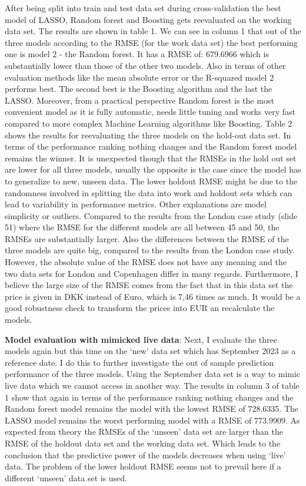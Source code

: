 \documentclass[
]{article}
\begin{document}
After being split into train and test data set during cross-validation
the best model of LASSO, Random forest and Boosting gets reevaluated on
the working data set. The results are shown in table 1. We can see in
column 1 that out of the three models according to the RMSE (for the
work data set) the best performing one is model 2 - the Random forest.
It has a RMSE of: 679.6966 which is substantially lower than those of
the other two models. Also in terms of other evaluation methods like the
mean absolute error or the R-squared model 2 performs best. The second
best is the Boosting algorithm and the last the LASSO. Moreover, from a
practical perspective Random forest is the most convenient model as it
is fully automatic, needs little tuning and works very fast compared to
more complex Machine Learning algorithms like Boosting. Table 2 shows
the results for reevaluating the three models on the hold-out data set.
In terms of the performance ranking nothing changes and the Random
forest model remains the winner. It is unexpected though that the RMSEs
in the hold out set are lower for all three models, usually the opposite
is the case since the model has to generalize to new, unseen data. The
lower holdout RMSE might be due to the randomness involved in splitting
the data into work and holdout sets which can lead to variability in
performance metrics. Other explanations are model simplicity or
outliers. Compared to the results from the London case study (slide 51)
where the RMSE for the different models are all between 45 and 50, the
RMSEs are substantially larger. Also the differences between the RMSE of
the three models are quite big, compared to the results from the London
case study. However, the absolute value of the RMSE does not have any
meaning and the two data sets for London and Copenhagen differ in many
regards. Furthermore, I believe the large size of the RMSE comes from
the fact that in this data set the price is given in DKK instead of
Euro, which is 7,46 times as much. It would be a good robustness check
to transform the prices into EUR an recalculate the models.

\textbf{Model evaluation with mimicked live data}: Next, I evaluate the
three models again but this time on the `new' data set which has
September 2023 as a reference date. I do this to further investigate the
out of sample prediction performance of the three models. Using the
September data set is a way to mimic live data which we cannot access in
another way. The results in column 3 of table 1 show that again in terms
of the performance ranking nothing changes and the Random forest model
remains the model with the lowest RMSE of 728.6335. The LASSO model
remains the worst performing model with a RMSE of 773.9909. As expected
from theory the RMSEs of the `unseen' data set are larger than the RMSE
of the holdout data set and the working data set. Which leads to the
conclusion that the predictive power of the models decreases when using
`live' data. The problem of the lower holdout RMSE seems not to prevail
here if a different `unseen' data set is used.
\end{document}
